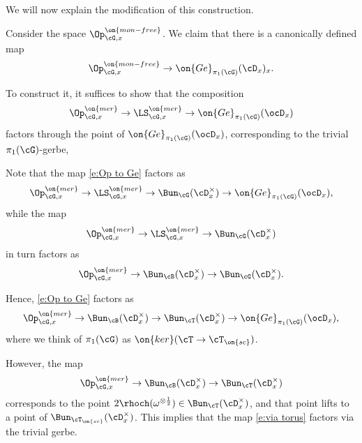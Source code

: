 \documentclass[9pt]{amsart}
\theoremstyle{remark}
\theoremstyle{definition}
\theoremstyle{remark}
\numberwithin{equation}{section}
\begin{document}
\medskip

We will now explain the modification of this construction. 

\sssec{}

Consider the space $\Op^{\on{mon-free}}_{\cG,x}$. We claim that there is a canonically defined map
\begin{equation} \label{e:mon-free opers to Ge}
\Op^{\on{mon-free}}_{\cG,x} \to \on{Ge}_{\pi_1(\cG)}(\cD_x)_x.
\end{equation} 

To construct it, it suffices to show that the composition
\begin{equation} \label{e:Op to Ge}
\Op^{\on{mer}}_{\cG,x} \to \LS^{\on{mer}}_{\cG,x} \to \on{Ge}_{\pi_1(\cG)}(\ocD_x)
\end{equation} 
factors through the point of $\on{Ge}_{\pi_1(\cG)}(\ocD_x)$, corresponding to the trivial $\pi_1(\cG)$-gerbe,

\medskip

Note that the map \eqref{e:Op to Ge} factors as 
$$\Op^{\on{mer}}_{\cG,x} \to \LS^{\on{mer}}_{\cG,x} \to \Bun_\cG(\cD^\times_x)\to  \on{Ge}_{\pi_1(\cG)}(\ocD_x),$$
while the map
$$\Op^{\on{mer}}_{\cG,x} \to \LS^{\on{mer}}_{\cG,x} \to \Bun_\cG(\cD^\times_x)$$
in turn factors as 
$$\Op^{\on{mer}}_{\cG,x} \to \Bun_\cB(\cD^\times_x) \to \Bun_\cG(\cD^\times_x).$$

Hence,  \eqref{e:Op to Ge} factors as 
\begin{equation} \label{e:via torus}
\Op^{\on{mer}}_{\cG,x} \to \Bun_\cB(\cD^\times_x) \to \Bun_\cT(\cD^\times_x) \to \on{Ge}_{\pi_1(\cG)}(\ocD_x),
\end{equation} 
where we think of $\pi_1(\cG)$ as $\on{ker}(\cT\to \cT_{\on{sc}})$. 

\medskip

However, the map
$$\Op^{\on{mer}}_{\cG,x} \to \Bun_\cB(\cD^\times_x) \to \Bun_\cT(\cD^\times_x)$$
corresponds to the point $2\rhoch(\omega^{\otimes \frac{1}{2}})\in \Bun_\cT(\cD^\times_x)$,
and that point lifts to a point of $\Bun_{\cT_{\on{sc}}}(\cD^\times_x)$. This implies that the map
\eqref{e:via torus} factors via the trivial gerbe. 
\end{document}
